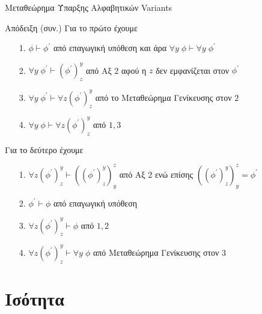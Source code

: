 \documentclass{beamer}
\begin{document}
\begin{frame}{Μεταθεώρημα Ύπαρξης Αλφαβητικών Variants}
  \begin{block}{Απόδειξη (συν.)}
    Για το πρώτο έχουμε
    \begin{itemize}
      \item[1.] $\phi \vdash \phi^\prime$ από επαγωγική υπόθεση και άρα $\forall y \; \phi \vdash \forall y \; \phi^\prime$
      \item[2.] $\forall y \; \phi^\prime \vdash (\phi^\prime)_z^y$ από Αξ 2 αφού η $z$ δεν εμφανίζεται στον $\phi^\prime$
      \item[3.] $\forall y \; \phi^\prime \vdash \forall z (\phi^\prime)_z^y$ από το Μεταθεώρημα Γενίκευσης στον $2$
      \item[4.] $\forall y \; \phi \vdash \forall z (\phi^\prime)_z^y$ από $1,3$
    \end{itemize}
    Για το δεύτερο έχουμε
    \begin{itemize}
      \item[1.] $\forall z (\phi^\prime)_z^y \vdash ((\phi^\prime)_z^y)_y^z$ από Αξ 2 ενώ επίσης $((\phi^\prime)_z^y)_y^z = \phi^\prime$
      \item[2.] $\phi^\prime \vdash \phi$ από επαγωγική υπόθεση
      \item[3.] $\forall z (\phi^\prime)_z^y \vdash \phi$ από $1,2$
      \item[4.] $\forall z (\phi^\prime)_z^y \vdash \forall y \; \phi$ από Μεταθεώρημα Γενίκευσης στον $3$
    \end{itemize}
  \end{block}
\end{frame}

\section{Ισότητα}
\end{document}
